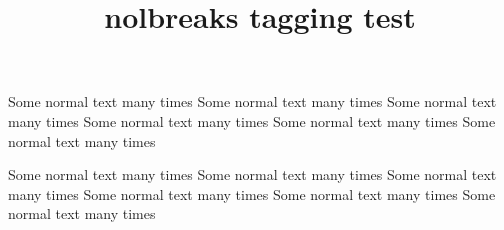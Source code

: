 \documentclass{article}
\title{nolbreaks tagging test}
\begin{document}
Some normal text many times Some normal text many times Some normal text many times Some normal text many times Some normal text many times Some normal text many times


Some normal text many times Some normal text many times Some normal text many times Some normal text many times Some normal text many times Some normal text many times

\end{document}
